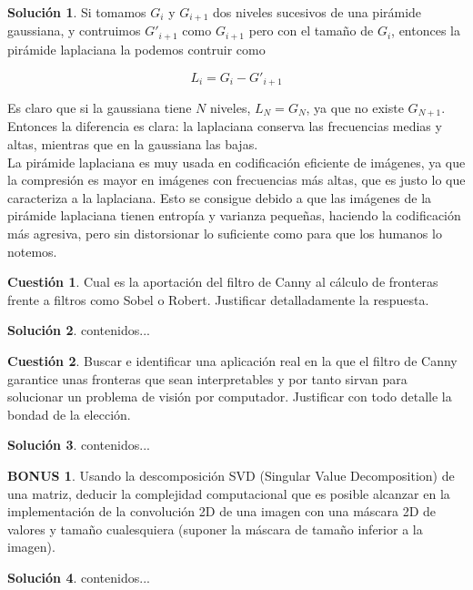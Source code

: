 \documentclass[a4paper, 11pt]{article}
\theoremstyle{definition}
\newtheorem{cuestion}{Cuestión}
\newtheorem*{solucion}{Solución}
\newtheorem*{bonus}{BONUS}
\begin{document}
  \begin{solucion}
     	Si tomamos $G_i$ y $G_{i+1}$ dos niveles sucesivos de una pirámide gaussiana,
      y contruimos $G'_{i+1}$ como $G_{i+1}$ pero con el tamaño de $G_i$, entonces
      la pirámide laplaciana la podemos contruir como

      $$L_i = G_i - G'_{i+1}$$

      Es claro que si la gaussiana tiene $N$ niveles, $L_N = G_N$, ya que no existe
      $G_{N+1}$. Entonces la diferencia es clara: la laplaciana conserva las
      frecuencias medias y altas, mientras que en la gaussiana las bajas. \\

      La pirámide laplaciana es muy usada en codificación eficiente de imágenes,
      ya que la compresión es mayor en imágenes con frecuencias más altas, que es
      justo lo que caracteriza a la laplaciana. Esto se consigue debido a que las
      imágenes de la pirámide laplaciana tienen entropía y varianza pequeñas,
      haciendo la codificación más agresiva, pero sin distorsionar lo suficiente
      como para que los humanos lo notemos.
  \end{solucion}

  \begin{cuestion}
     	Cual es la aportación del filtro de Canny al cálculo de fronteras
      frente a filtros como Sobel o Robert. Justificar detalladamente la
      respuesta.
  \end{cuestion}

  \begin{solucion}
     	contenidos...
  \end{solucion}
  \begin{cuestion}
     	Buscar e identificar una aplicación real en la que el filtro de
      Canny garantice unas fronteras que sean interpretables y por tanto sirvan
       para solucionar un problema de visión por computador.
        Justificar con todo detalle la bondad de la elección.

  \end{cuestion}

  \begin{solucion}
     	contenidos...
  \end{solucion}
  \begin{bonus}
     	Usando la descomposición SVD (Singular Value
      Decomposition) de una matriz, deducir la complejidad computacional que es
      posible alcanzar en la implementación de la convolución 2D de una imagen
      con una máscara 2D de valores y tamaño cualesquiera (suponer la máscara de
      tamaño inferior a la imagen).

  \end{bonus}

  \begin{solucion}
     	contenidos...
  \end{solucion}
\end{document}
